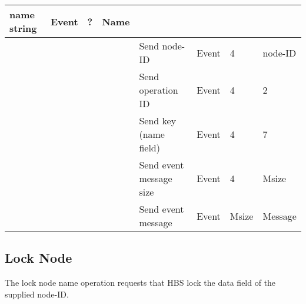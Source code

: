 \begin{tabular}{|p{1.2in}|p{.4in}|p{.4in}|p{.5in}|p{1.2in}|p{.4in}|p{.4in}|p{.5in} |}
                                             name string  & Event  &  ?    & Name  \\ \hline
                  &        &       &       & Send node-ID  & Event  &   4   &   node-ID    \\  \hline
                  &        &       &       & Send operation 
                                             ID           & Event  &   4   &  2   \\ \hline
                  &        &       &       & Send key (name field)     & Event  &   4   &  7    \\ \hline
                  &        &       &       & Send event message
                                                  size    & Event  &   4   &  Msize \\ \hline
                  &        &       &       & Send event message
                                                          & Event  & Msize& Message  \\ \hline
\end{tabular}
\normalsize
\bigskip



\newpage
\subsection{Lock Node }

The lock node name operation requests that HBS lock the data field
of the supplied node-ID.


